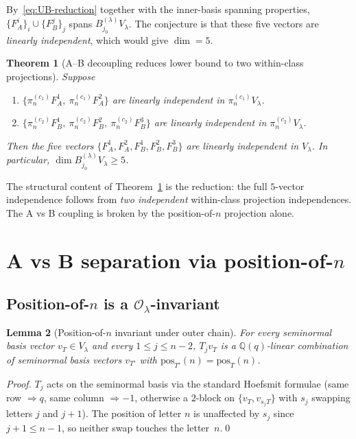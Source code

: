 \documentclass[11pt]{article}
\newtheorem{theorem}{Theorem}
\newtheorem{lemma}[theorem]{Lemma}
\theoremstyle{definition}
\begin{document}
By~\eqref{eq:UB-reduction} together with the inner-basis spanning
properties, $\{F_A^i\}_i \cup \{F_B^j\}_j$ spans
$B^{(\lambda)}_{j_0} V_\lambda$. The conjecture is that these five
vectors are \emph{linearly independent}, which would give
$\dim = 5$.

\begin{theorem}[A--B decoupling reduces lower bound to two within-class projections]\label{thm:main}
Suppose
\begin{enumerate}[leftmargin=2em,topsep=0.2em,itemsep=0.1em,label=(\alph*)]
\item $\{\pi^{(c_1)}_n F_A^1,\ \pi^{(c_1)}_n F_A^2\}$ are
linearly independent in $\pi^{(c_1)}_n V_\lambda$.
\item $\{\pi^{(c_2)}_n F_B^1,\ \pi^{(c_2)}_n F_B^2,\ \pi^{(c_2)}_n F_B^3\}$
are linearly independent in $\pi^{(c_2)}_n V_\lambda$.
\end{enumerate}
Then the five vectors $\{F_A^1, F_A^2, F_B^1, F_B^2, F_B^3\}$ are
linearly independent in $V_\lambda$. In particular,
$\dim B^{(\lambda)}_{j_0} V_\lambda \ge 5$.
\end{theorem}

The structural content of Theorem~\ref{thm:main} is the reduction:
the full $5$-vector independence follows from \emph{two independent}
within-class projection independences. The A vs B coupling is broken
by the position-of-$n$ projection alone.

\section{A vs B separation via position-of-$n$}\label{sec:AvsB}

\subsection{Position-of-$n$ is a $\mathcal{O}_\lambda$-invariant}

\begin{lemma}[Position-of-$n$ invariant under outer chain]\label{lem:posn}
For every seminormal basis vector $v_T \in V_\lambda$ and every
$1 \le j \le n - 2$, $T_j v_T$ is a $\mathbb{Q}(q)$-linear
combination of seminormal basis vectors $v_{T'}$ with
$\mathrm{pos}_{T'}(n) = \mathrm{pos}_T(n)$.
\end{lemma}

\begin{proof}
$T_j$ acts on the seminormal basis via the standard Hoefsmit formulae
(same row $\Rightarrow q$, same column $\Rightarrow -1$, otherwise a
$2$-block on $\{v_T, v_{s_jT}\}$ with $s_j$ swapping letters $j$
and $j+1$). The position of letter $n$ is unaffected by $s_j$ since
$j + 1 \le n - 1$, so neither swap touches the letter~$n$.\qed
\end{proof}
\end{document}

